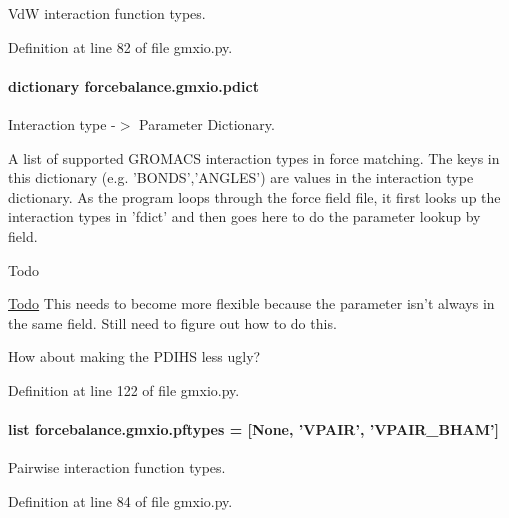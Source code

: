 Vd\-W interaction function types. 



Definition at line 82 of file gmxio.\-py.

\hypertarget{namespaceforcebalance_1_1gmxio_ae845e0b923ecde16c79f2742b94534a6}{
\paragraph[{pdict}]{\setlength{\rightskip}{0pt plus 5cm}dictionary forcebalance.\-gmxio.\-pdict}}\label{namespaceforcebalance_1_1gmxio_ae845e0b923ecde16c79f2742b94534a6}


Interaction type -\/$>$ Parameter Dictionary. 

A list of supported G\-R\-O\-M\-A\-C\-S interaction types in force matching. The keys in this dictionary (e.\-g. 'B\-O\-N\-D\-S','A\-N\-G\-L\-E\-S') are values in the interaction type dictionary. As the program loops through the force field file, it first looks up the interaction types in 'fdict' and then goes here to do the parameter lookup by field. \begin{DoxyRefDesc}{Todo}
\item[\hyperlink{todo__todo000010}{Todo}]This needs to become more flexible because the parameter isn't always in the same field. Still need to figure out how to do this. 

How about making the P\-D\-I\-H\-S less ugly? \end{DoxyRefDesc}


Definition at line 122 of file gmxio.\-py.

\hypertarget{namespaceforcebalance_1_1gmxio_a59695b79df36efbe64ac88fd64bfb366}{
\paragraph[{pftypes}]{\setlength{\rightskip}{0pt plus 5cm}list forcebalance.\-gmxio.\-pftypes = \mbox{[}None, 'V\-P\-A\-I\-R', 'V\-P\-A\-I\-R\-\_\-\-B\-H\-A\-M'\mbox{]}}}\label{namespaceforcebalance_1_1gmxio_a59695b79df36efbe64ac88fd64bfb366}


Pairwise interaction function types. 



Definition at line 84 of file gmxio.\-py.

